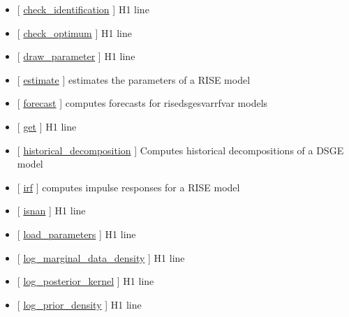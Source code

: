 \documentclass[letterpaper,10pt,english]{sphinxmanual}
\begin{document}
\label{classes/models/@rfvar/rfvar:rfvar-methods}\begin{itemize}
\item {} 
{[} {\hyperref[classes/models/@rfvar/rfvar:check-identification]{check\_identification}} {]}   H1 line

\item {} 
{[} {\hyperref[classes/models/@rfvar/rfvar:check-optimum]{check\_optimum}} {]}   H1 line

\item {} 
{[} {\hyperref[classes/models/@rfvar/rfvar:draw-parameter]{draw\_parameter}} {]}   H1 line

\item {} 
{[} {\hyperref[classes/models/@rfvar/rfvar:estimate]{estimate}} {]}  estimates the parameters of a RISE model

\item {} 
{[} {\hyperref[classes/models/@rfvar/rfvar:forecast]{forecast}} {]}  computes forecasts for rise\textbar{}dsge\textbar{}svar\textbar{}rfvar models

\item {} 
{[} {\hyperref[classes/models/@rfvar/rfvar:get]{get}} {]}   H1 line

\item {} 
{[} {\hyperref[classes/models/@rfvar/rfvar:historical-decomposition]{historical\_decomposition}} {]} Computes historical decompositions of a DSGE model

\item {} 
{[} {\hyperref[classes/models/@rfvar/rfvar:irf]{irf}} {]}  computes impulse responses for a RISE model

\item {} 
{[} {\hyperref[classes/models/@rfvar/rfvar:isnan]{isnan}} {]}   H1 line

\item {} 
{[} {\hyperref[classes/models/@rfvar/rfvar:load-parameters]{load\_parameters}} {]}   H1 line

\item {} 
{[} {\hyperref[classes/models/@rfvar/rfvar:log-marginal-data-density]{log\_marginal\_data\_density}} {]}   H1 line

\item {} 
{[} {\hyperref[classes/models/@rfvar/rfvar:log-posterior-kernel]{log\_posterior\_kernel}} {]}   H1 line

\item {} 
{[} {\hyperref[classes/models/@rfvar/rfvar:log-prior-density]{log\_prior\_density}} {]}   H1 line


\end{itemize}
\end{document}
